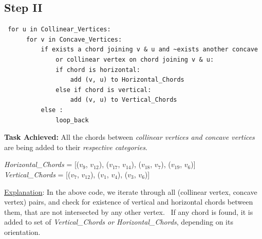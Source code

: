 \subsection{Step II} %
\label{sub:step_2}
\begin{lstlisting}
 for u in Collinear_Vertices:
      for v in Concave_Vertices:
          if exists a chord joining v & u and ~exists another concave 
              or collinear vertex on chord joining v & u:
              if chord is horizontal:
                  add (v, u) to Horizontal_Chords
              else if chord is vertical:
                  add (v, u) to Vertical_Chords
          else :
              loop_back
\end{lstlisting}
\textbf{Task Achieved:} All the chords between \emph{collinear vertices and concave vertices} are being added to their \emph{respective categories}. 

\begin{figure}[h]
  \centering
\end{figure}

\emph{Horizontal\_Chords} =  [($v_{9}$, $v_{12}$), ($v_{17}$, $v_{14}$), ($v_{18}$, $v_{7}$), ($v_{19}$, $v_{6}$)] \\
\emph{Vertical\_Chords} =  [($v_{7}$, $v_{12}$), ($v_{1}$, $v_{4}$), ($v_{3}$, $v_{6}$)] 

\underline{Explanation}:
In the above code, we iterate through all (collinear vertex, concave vertex) pairs, and check for existence of vertical and horizontal chords between them, that are not intersected by any other vertex. \
If any chord is found, it is added to set of \emph{Vertical\_Chords or Horizontal\_Chords}, depending on its orientation. 

